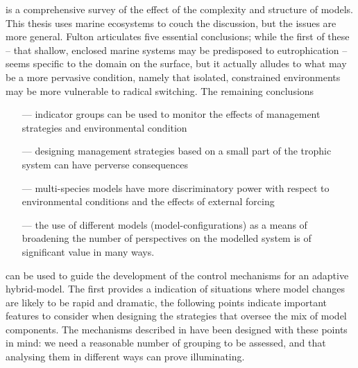 \Cite{fultonPhD} is a comprehensive survey of the effect of the
complexity and structure of models.  This thesis uses marine
ecosystems to couch the discussion, but the issues are more general.
Fulton articulates five essential conclusions; while the first of
these -- that shallow, enclosed marine systems may be predisposed to
eutrophication -- seems specific to the domain on the surface, but it
actually alludes to what may be a more pervasive condition, namely
that isolated, constrained environments may be more vulnerable to
radical switching. The remaining conclusions
\begin{itemize}
\item[---] indicator groups can be used to monitor the effects of
management strategies and environmental condition
\item[---] designing management strategies based on a small part of
the trophic system can have perverse consequences
\item[---] multi-species models have more discriminatory power with
respect to environmental conditions and the effects of external
forcing

\item[---] the use of different models (model-configurations) as a
means of broadening the number of perspectives on the modelled system
is of significant value in many ways.
\end{itemize}
can be used to guide the development of the control mechanisms for an
adaptive hybrid-model. The first provides a indication of
situations where model changes are likely to be rapid and dramatic,
the following points indicate important features to consider when
designing the strategies that oversee the mix of model
components. The mechanisms described in \Cfive have been designed with
these points in mind: we need a reasonable number of grouping to be
assessed, and that analysing them in different ways can prove
illuminating. 


